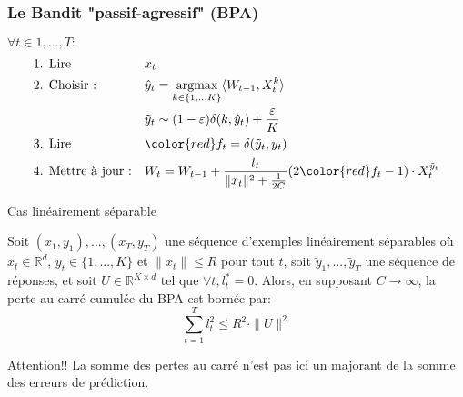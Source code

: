 \documentclass{beamer}
\begin{document}
\begin{frame}
	\frametitle{Le Bandit "passif-agressif" (BPA)}
%		
	
	\begin{block}{}
		$\forall t \in 1,...,T :$
		\begin{align*}
		&\text{1. Lire } 
		&& x_t 
		\\
		&\text{2. Choisir :} 
		&& \hat{y}_t = \underset{k \in\{1,..,K\}}{\text{argmax}}  \langle W_{t-1}, X_t^k \rangle 
		\\
		& %
		&& \tilde{y}_t \sim (1-\varepsilon) \delta(k,\hat{y}_t) + \frac{\varepsilon}{K} 
		\\	
		&\text{3. Lire } 
		&& {\color{red} f_t = \delta(\tilde{y}_t ,y_t)}  
		\\
		&\text{4. Mettre à jour :} 
		&& W_t = W_{t-1} + \frac{l_t}{\|x_t\|^2 + \frac{1}{2C}} (2{\color{red}f_t}-1)\cdot X_t^{\tilde{y}_t}
		\end{align*}
	\end{block}
	
\end{frame}

\begin{frame}{Cas linéairement séparable}
	\begin{theorem}
		\label{theo:BPAT1}
		Soit $(x_1,y_1),...,(x_T,y_T)$ une séquence d'exemples linéairement séparables où $x_t \in \mathbb{R}^d$, $y_t\in \{1,...,K\}$ et $\parallel x_t \parallel\leqslant R$ pour tout $t$, soit $\tilde{y}_1,...,\tilde{y}_T$ une séquence de réponses, et soit $U \in \mathbb{R}^{K\times d}$ tel que $ \forall t, l^*_t=0$. Alors, en supposant $C \rightarrow \infty$, la perte au carré cumulée du BPA est bornée par:
		\begin{equation*}
		\sum_{t=1}^{T} l_t^2 \leqslant R^2\cdot \parallel{U}\parallel^2
		\end{equation*}
	\end{theorem}
	
	\begin{alertblock}{Attention!!}
		La somme des pertes au carré n'est pas ici un majorant de la somme des erreurs de prédiction.
	\end{alertblock}
\end{frame}
\end{document}
